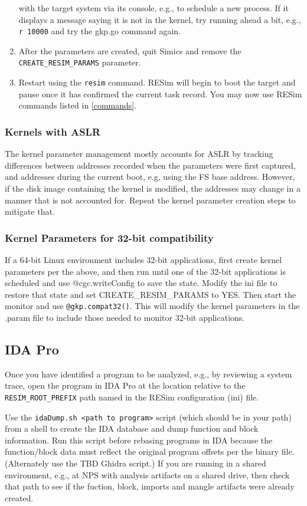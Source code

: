 \documentclass[titlepage]{article}
\begin{document}
\begin{enumerate}
with the target system via its console, e.g., to schedule a new process.  If it displays a message saying it is not in the kernel,
try running ahead a bit, e.g., {\tt r 10000} and try the gkp.go command again.
\item After the parameters are created, quit Simics and remove the {\tt CREATE\_RESIM\_PARAMS} parameter.
\item Restart using the {\tt resim} command.  RESim will begin to boot the target and pause once it has confirmed the current task record.  You
may now use RESim commands listed in \ref{commands}.
\end{enumerate}

\subsubsection{Kernels with ASLR}
The kernel parameter management mostly accounts for ASLR by tracking differences between addresses recorded when the parameters were first
captured, and addresses during the current boot, e.g, using the FS base address.  However, if the disk image containing the kernel is modified,
the addresses may change in a manner that is not accounted for.  Repeat the kernel parameter creation steps to mitigate that.

\subsubsection{Kernel Parameters for 32-bit compatibility}
If a 64-bit Linux environment includes 32-bit applications, first create kernel parameters per the above, and then run until one of the 32-bit applications
is scheduled and use @cgc.writeConfig to save
the state.  Modify the ini file to restore that state and set CREATE\_RESIM\_PARAMS to YES.  Then start the monitor and use
{\tt @gkp.compat32()}.  This will modify the kernel parameters in the .param file to include those needed to monitor 32-bit applications.

\subsection{IDA Pro}
\label{ida}
Once you have identified a program to be analyzed, e.g., by reviewing a system trace, open the program in IDA Pro at the location relative to the 
{\tt RESIM\_ROOT\_PREFIX} path named in the RESim configuration (ini) file.  

Use the {\tt idaDump.sh <path to program>} script (which should be in your path) from a shell to create the IDA database and dump function and block information.  
Run this script before rebasing programs in IDA because the function/block data must reflect the original program offsets per the binary file.
(Alternately use the TBD Ghidra script.)  If you are running in a shared environment, e.g., at NPS with analysis artifacts on a shared drive, then 
check that path to see if the fuction, block, imports and mangle artifacts were already created.
\end{document}
